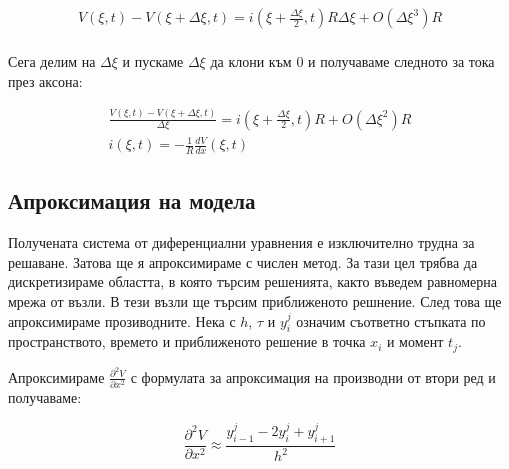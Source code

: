 \documentclass{article}
\begin{document}
    \begin{gather*} 
        V\left(\xi,t\right) - V\left(\xi + \Delta\xi, t\right) = i\left(\xi + \frac{\Delta\xi}{2},t\right)R\Delta\xi +
        O\left(\Delta\xi^3\right)R\\
     \end{gather*}

     Сега делим на $\Delta\xi$ и пускаме $\Delta\xi$ да клони към 0 и получаваме следното за тока през аксона:
     
    \begin{gather*} 
        \frac{V\left(\xi,t\right) - V\left(\xi + \Delta\xi, t\right)}{\Delta\xi} = i\left(\xi + \frac{\Delta\xi}{2},t\right)R +
        O\left(\Delta\xi^2\right)R\\
        i\left(\xi,t\right) = -\frac{1}{R}\frac{dV}{dx}\left(\xi,t\right)
     \end{gather*}





    \subsection{Апроксимация на модела} 
    Получената система от диференциални уравнения е изключително трудна за решаване. Затова ще я апроксимираме с числен метод. За тази цел
    трябва да дискретизираме областта, в която търсим решенията, както въведем равномерна мрежа от възли. В тези възли ще търсим приближеното решнение.
    След това ще апроксимираме прозиводните. Нека с $h$, $\tau$ и $y_i^j$ означим съответно стъпката по пространството, времето и
    приближеното решение в точка $x_i$ и момент $t_j$. 
    
    Апроксимираме $\frac{\partial^2 V}{\partial x^2}$ с формулата за апроксимация на производни от втори ред и получаваме:

    \begin{equation}\label{der:mid_space}
        \frac{\partial^2 V}{\partial x^2} \approx \frac{y_{i-1}^j - 2y_i^j + y_{i+1}^j}{h^2}
    \end{equation}
    
\end{document}
